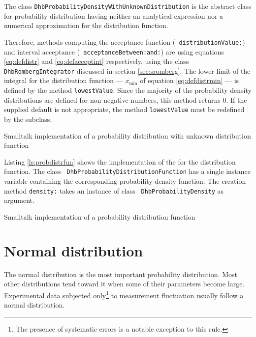 \documentclass[twoside]{book}
\begin{document}
The class {\tt DhbProbabilityDensityWithUnknownDistribution} is
the abstract class for probability distribution having neither an
analytical expression nor a numerical approximation for the
distribution function.

Therefore, methods computing the acceptance function ({\tt
distributionValue:}) and interval acceptance ({\tt
acceptanceBetween:and:}) are using equations \ref{eq:defdistr} and
\ref{eq:defacceptint} respectively, using the class {\tt
DhbRombergIntegrator} discussed in section \ref{sec:sromberg}. The
lower limit of the integral for the distribution function ---
$x_{\min}$ of equation \ref{eq:defdistrmin} --- is defined by the
method {\tt lowestValue}. Since the majority of the probability
density distributions are defined for non-negative numbers, this
method returns 0. If the supplied default is not appropriate, the
method {\tt lowestValue} must be redefined by the subclass.

\begin{listing} Smalltalk implementation of a probability distribution with unknown
distribution function\label{ls:probunkdistr}

\end{listing}

Listing \ref{ls:probdistrfun} shows the implementation of the
 for the distribution function. The class {\tt
DhbProbabilityDistributionFunction} has a single instance variable
containing the corresponding probability density function. The
creation method {\tt density:} takes an instance of class {\tt
DhbProbabilityDensity} as argument.

\begin{listing} Smalltalk implementation of a probability distribution function
\label{ls:probdistrfun}

\end{listing}


\section{Normal distribution}
\label{sec:normdist} The normal distribution is the most important
probability distribution. Most other distributions tend toward it
when some of their parameters become large. Experimental data
subjected only\footnote{The presence of systematic errors is a
notable exception to this rule.} to measurement fluctuation
usually follow a normal distribution.
\end{document}
